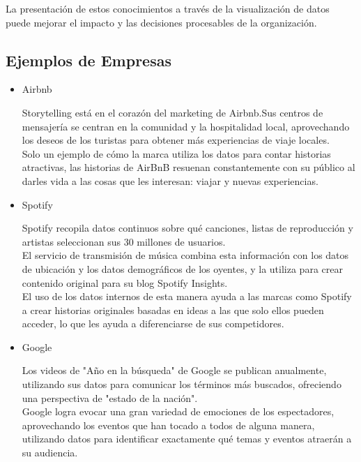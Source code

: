 \documentclass[preprint,12pt]{elsarticle}
\begin{document}
La presentación de estos conocimientos a través de la visualización de datos puede mejorar el impacto y las decisiones procesables de la organización.\\

\subsection{Ejemplos de Empresas}	

\begin{itemize}
		\item Airbnb

Storytelling está en el corazón del marketing de Airbnb.Sus centros de mensajería se centran en la comunidad y la hospitalidad local, aprovechando los deseos de los turistas para obtener más experiencias de viaje locales. \\

Solo un ejemplo de cómo la marca utiliza los datos para contar historias atractivas, las historias de AirBnB resuenan constantemente con su público al darles vida a las cosas que les interesan: viajar y nuevas experiencias.\\

		\item Spotify

Spotify recopila datos continuos sobre qué canciones, listas de reproducción y artistas seleccionan sus 30 millones de usuarios.\\  

El servicio de transmisión de música combina esta información con los datos de ubicación y los datos demográficos de los oyentes, y la utiliza para crear contenido original para su blog Spotify Insights.\\

El uso de los datos internos de esta manera ayuda a las marcas como Spotify a crear historias originales basadas en ideas a las que solo ellos pueden acceder, lo que les ayuda a diferenciarse de sus competidores.\\

		\item Google

Los videos de "Año en la búsqueda" de Google se publican anualmente, utilizando sus datos para comunicar los términos más buscados, ofreciendo una perspectiva de "estado de la nación".\\

Google logra evocar una gran variedad de emociones de los espectadores, aprovechando los eventos que han tocado a todos de alguna manera, utilizando datos para identificar exactamente qué temas y eventos atraerán a su audiencia.\\

\end{itemize}
\end{document}
